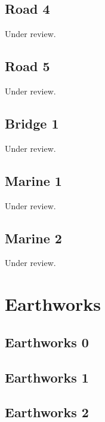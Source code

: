 \documentclass{scrartcl}
\begin{document}
\subsection{Road 4}
\label{sec:road_4}
Under review.%
\clearpage

\subsection{Road 5}
\label{sec:road_5}
Under review.%
\clearpage

\subsection{Bridge 1}
\label{sec:bridge_1}
Under review.%
\clearpage

\subsection{Marine 1}
\label{sec:marine_1}
Under review.%
\clearpage

\subsection{Marine 2}
\label{sec:marine_2}
Under review.%
\clearpage

\section{Earthworks}

\subsection{Earthworks 0}
\label{sec:earth_0}
\clearpage

\subsection{Earthworks 1}
\label{sec:earth_1}
\clearpage

\subsection{Earthworks 2}
\label{sec:earth_2}
\clearpage
\end{document}
